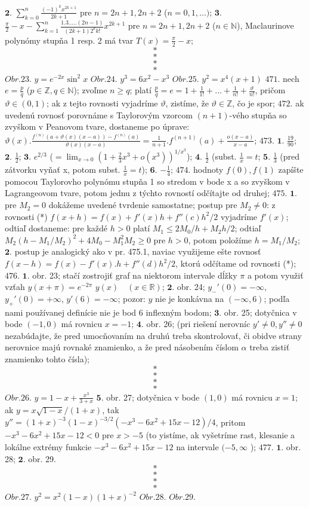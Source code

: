 $\boldsymbol{2.}$ $\sum_{k=0}^n \frac{(-1)^{k}x^{2k+1}}{2k+1}$ pre $n=2n+1,2n+2$ ($n=0,1,...)$;
$\boldsymbol{3.}$ $\frac{\pi}{2}-x- \sum_{k=1}^n \frac{1.3.....(2n-1)}{(2k+1)2^{k}k!}x^{2k+1}$ pre $n=2n+1,2n+2$ ($n\in \mathbb{N}$), Maclaurinove polynómy stupňa 1 resp. 2 má tvar $T(x)=\frac{\pi}{2}- x$;
$$*$$
$$*$$
$$*$$
$$*$$
$\boxed{Obr.23.}$  $y=e^{-2x}\sin ^{2} x$
$\boxed{Obr.24.}$  $y^{3}=6x^{2}-x^{3}$
$\boxed{Obr.25.}$  $y^{2}=x^{4}(x+1)$
$\boxed{471.}$  nech $e=\frac{p}{q}$ ($p\in \mathbb{Z}, q\in \mathbb{N}$); zvoľme $n\geq q$; platí $\frac{p}{q}=e=1+\frac{1}{1!}+...+\frac{1}{n!}+\frac{\vartheta}{n!}$, pričom $\vartheta \in(0,1)$; ak z tejto rovnosti vyjadríme $\vartheta$, zistíme, že $\vartheta \in \mathbb{Z}$, čo je spor;
$\boxed{472.}$ ak uvedenú rovnosť porovnáme s Taylorovým vzorcom $(n+1)$-vého stupňa so zvyškom v Peanovom tvare, dostaneme po úprave: $\vartheta (x).\frac{f^{(n)}(a+\vartheta (x)(x-a))-f^{(n)}(a)}{\vartheta (x)(x-a)}=\frac{1}{n+1}.f^{(n+1)}(a)+\frac{o(x-a)}{x-a}$;
$\boxed{473.}$ $\boldsymbol{1.}$ $\frac{19}{90}$;
$\boldsymbol{2.}$ $\frac{1}{2}$;
$\boldsymbol{3.}$ $e^{2/3}$ ($=\lim_{x \to 0}(1+\frac{2}{3}x^{3}+o(x^{3}))^{1/x^{3}}$);
$\boldsymbol{4.}$ $\frac{1}{2}$ (subst. $\frac{1}{x}=t$;
$\boldsymbol{5.}$ $\frac{1}{3}$ (pred zátvorku vyňať x, potom subst. $\frac{1}{x}=t$);
$\boldsymbol{6.}$ $-\frac{1}{4}$;
$\boxed{474.}$ hodnoty $f(0),f(1)$ zapíšte pomocou Taylorovho polynómu stupňa 1 so stredom v bode x a so zvyškom v Lagrangeovom tvare, potom jednu z týchto rovností odčítajte od druhej;
$\boxed{475.}$ $\boldsymbol{1.}$ pre $M_{2}=0$ dokážeme uvedené tvrdenie samostatne; postup pre $M_{2}\ne 0$: z rovnosti (*) $f(x+h)=f(x)+f'(x)h+f''(c)h^{2}/2$ vyjadríme $f'(x)$; odtiaľ dostaneme: pre každé $h>0$ platí $M_{1}\leq 2M_{0}/h+M_{2}h/2$; odtiaľ $M_{2}(h-M_{1}/M_{2})^{2}+4M_{0}-M_{1}^{2}M_{2}\geq 0$  pre $h>0$, potom položíme $h=M_{1}/M_{2}$;
$\boldsymbol{2.}$ postup je analogický ako v pr. 475.1, naviac využijeme ešte rovnosť $f(x-h)=f(x)-f'(x).h+f''(d)h^{2}/2$, ktorú odčítame od rovnosti (*);
$\boxed{476.}$ $\boldsymbol{1.}$ obr. 23; stačí zostrojiť graf na niektorom intervale dĺžky $\pi$ a potom využiť vzťah  $y(x+\pi)=e^{-2\pi}$ $y(x)\quad (x\in \mathbb{R}) $; 
$\boldsymbol{2.}$ obr. 24; $y_{-}'(0)=-\infty$, $y_{+}'(0)=+\infty$, $y'(6)=-\infty$; pozor: $y$ nie je konkávna na $(-\infty ,6)$; podľa nami používanej definície nie je bod 6 inflexným bodom;
$\boldsymbol{3.}$ obr. 25; dotyčnica v bode $(-1,0)$ má rovnicu $x=-1$;
$\boldsymbol{4.}$ obr. 26; (pri riešení nerovníc  $y'\ne 0, y''\ne 0$ 	nezabúdajte, že pred umocňovaním na druhú treba skontrolovať, či obidve strany nerovnice majú rovnaké znamienko, a že pred násobením číslom $\alpha $ treba zistiť znamienko tohto čísla);
$$*$$
$$*$$
$$*$$
$$*$$
$\boxed{Obr.26.}$  $y=1-x+\frac{x^{3}}{3+x}$
$\boldsymbol{5.}$ obr. 27; dotyčnica v bode $(1,0)$ má rovnicu $x=1$; ak $y=x\sqrt{1-x}/(1+x)$, tak $y''=(1+x)^{-3}(1-x)^{-3/2}(-x^{3}-6x^{2}+15x-12)/4$, pritom  $-x^{3}-6x^{2}+15x-12<0$ pre $x>-5$ (to yistíme, ak vyšetríme rast, klesanie a lokálne extrémy funkcie $-x^{3}-6x^{2}+15x-12$ na intervale $(-5,\infty$ );
$\boxed{477.}$ $\boldsymbol{1.}$ obr. 28;
$\boldsymbol{2.}$ obr. 29.$$*$$
$$*$$
$$*$$
$$*$$
$\boxed{Obr.27.}$  $y^{2}=x^{2}(1-x)(1+x)^{-2}$
$\boxed{Obr.28.}$
$\boxed{Obr.29.}$